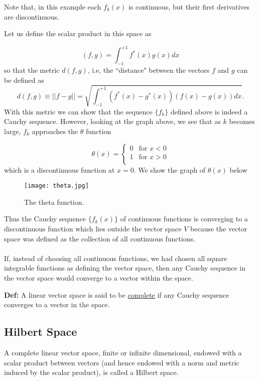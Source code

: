Note that, in this example each $f_k(x)$ is continuous, but their first derivatives are discontinuous.

Let us define the scalar product in this space as

$$(f,g) = \int_{-1}^{+1} f^{\ast}(x) g(x) dx $$
so that the metric $d(f,g)$, i.e, the ``distance"   between the vectors $f$ and $g$ can be defined as
\[
d(f,g) \equiv || f-g || = \sqrt{ \int_{-1}^{+1} \left( f^*(x)-g^*(x)\right)\left( f(x)-g(x)\right) dx }. \]
With this metric we can show that the sequence $\{f_k\}$ defined above is indeed a Cauchy sequence. However, looking at the graph above, we see that as $k$ becomes large, $f_k$ approaches the $\theta$ function

\[
 \theta(x) = 
  \begin{cases} 
   0    & \text{for } x < 0 \\
   1    & \text{for } x > 0 \\
  \end{cases}
\]
which is a discontinuous function at $x=0$. We show the graph of $\theta(x)$ below
\begin{figure}[ht!]
\centering
\texttt{[image: theta.jpg]}
\caption{The theta function.}
\end{figure}


Thus the Cauchy sequence $\{f_k(x)\}$ of continuous functions is converging to a discontinuous function which lies outside the vector space $V$ because the vector space was defined as the collection of all continuous functions.

\paragraph{}
If, instead of choosing all continuous functions, we had chosen all square integrable functions as defining the vector space, then any Cauchy sequence in the vector space would converge to a vector within the space.

\vspace{3 mm}
\textbf{Def: } A linear vector space is said to be \underline{complete} if any Cauchy sequence converges to a vector in the space.




\subsection{Hilbert Space}

A complete linear vector space, finite or infinite dimensional, endowed with a scalar product between vectors (and hence endowed with a norm and metric induced by the scalar product), is called a Hilbert space.

